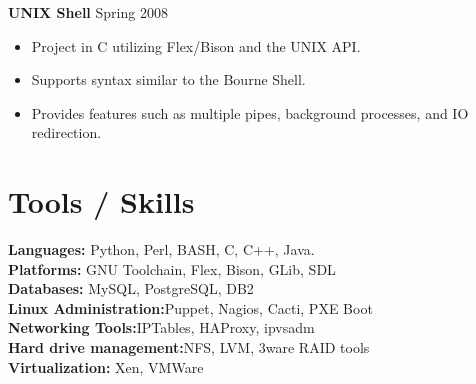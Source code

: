 \documentclass[10pt,line,margin,letterpaper]{res}
\begin{document}
\begin{resume}
    {\bf UNIX Shell} \hfill Spring 2008
    \begin{itemize} \itemsep -2pt
    \item Project in C utilizing Flex/Bison and the UNIX API.
    \item Supports syntax similar to the Bourne Shell.
    \item Provides features such as multiple pipes, background processes, and IO redirection.
    \end{itemize}

\section{Tools / Skills}
    {\bf Languages:} Python, Perl, BASH, C, C++, Java. \\
    {\bf Platforms:} GNU Toolchain, Flex, Bison, GLib, SDL \\
    {\bf Databases:} MySQL, PostgreSQL, DB2 \\
    {\bf Linux Administration:}Puppet, Nagios, Cacti, PXE Boot \\
    {\bf Networking Tools:}IPTables, HAProxy, ipvsadm \\
    {\bf Hard drive management:}NFS, LVM, 3ware RAID tools \\
    {\bf Virtualization:} Xen, VMWare \\

\end{resume}
\end{document}
